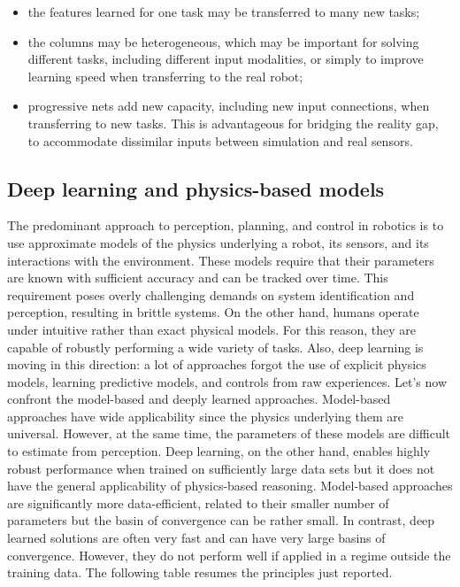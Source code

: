\begin{itemize}
\item
  the features learned for one task may be transferred to many new
  tasks;
\item
  the columns may be heterogeneous, which may be important for solving
  different tasks, including different input modalities, or simply to
  improve learning speed when transferring to the real robot;
\item
  progressive nets add new capacity, including new input connections,
  when transferring to new tasks. This is advantageous for bridging the
  reality gap, to accommodate dissimilar inputs between simulation and
  real sensors.
\end{itemize}



\subsection{Deep learning and physics-based models}\label{header-n53}

The predominant approach to perception, planning, and control in
robotics is to use approximate models of the physics underlying a robot,
its sensors, and its interactions with the environment. These models
require that their parameters are known with sufficient accuracy and can
be tracked over time. This requirement poses overly challenging demands
on system identification and perception, resulting in brittle systems.
On the other hand, humans operate under intuitive rather than exact
physical models. For this reason, they are capable of robustly
performing a wide variety of tasks. Also, deep learning is moving in
this direction: a lot of approaches forgot the use of explicit physics
models, learning predictive models, and controls from raw experiences.
Let's now confront the model-based and deeply learned approaches.
Model-based approaches have wide applicability since the physics
underlying them are universal. However, at the same time, the parameters
of these models are difficult to estimate from perception. Deep
learning, on the other hand, enables highly robust performance when
trained on sufficiently large data sets but it does not have the general
applicability of physics-based reasoning. Model-based approaches are
significantly more data-efficient, related to their smaller number of
parameters but the basin of convergence can be rather small. In
contrast, deep learned solutions are often very fast and can have very
large basins of convergence. However, they do not perform well if
applied in a regime outside the training data. The following table
resumes the principles just reported.

